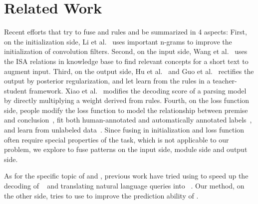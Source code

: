 \section{Related Work}

Recent efforts that try to fuse \NN and rules and be summarized in 4 aspects:
First, on the initialization side, Li et al.~ uses important n-grams to improve the initialization of convolution filters.
Second, on the input side, Wang et al.~ uses the ISA relations in knowledge base to find relevant concepts for a short text to augment input.
Third, on the output side, Hu et al.~ and Guo et al.~ rectifies the \NN output by posterior regularization, and let \NN learn from the rules in a teacher-student framework. 
Xiao et al.~ modifies the decoding score of a parsing model by directly multiplying a weight derived from rules. 
Fourth, on the loss function side, people modify the loss function to model the relationship between premise and conclusion~\cite{demeester2016lifted}, fit both human-annotated and automatically annotated labels~\cite{alashkar2017examples}, and learn from unlabeled data~\cite{xu2017semantic}.
Since fusing in initialization and loss function often require special properties of the task, which is not applicable to our problem, we explore to fuse \RE patterns on the input side, \NN module side and output side.   

As for the specific topic of \RE and \NN, previous work have tried using \RE to speed up the decoding of \NN~\cite{strauss2016regular} and translating natural language queries into \REs~\cite{locascio2016neural}. Our method, on the other side, tries to use \RE to improve the prediction ability of \NN.

